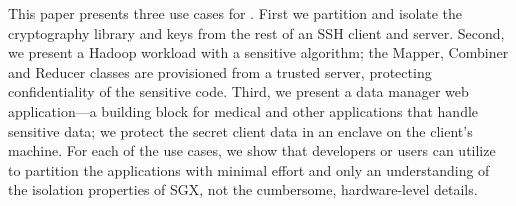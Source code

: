 This paper presents three use cases for \sysname{}.
First we partition and isolate the 
cryptography library and keys from the rest of an SSH client and  server.
Second, we present a Hadoop workload with a sensitive algorithm;
the %
Mapper, Combiner and Reducer classes are provisioned from a trusted server, protecting confidentiality of the sensitive code.
Third, we present a data manager web application---a building block for medical and other applications that handle sensitive data; 
we protect the secret client data in an enclave on the client's machine.
For each of the use cases, we show that developers or users
can utilize \sysname{} to partition the applications
with minimal effort
and only an understanding of the isolation properties of SGX,
not the cumbersome, hardware-level details.  %


